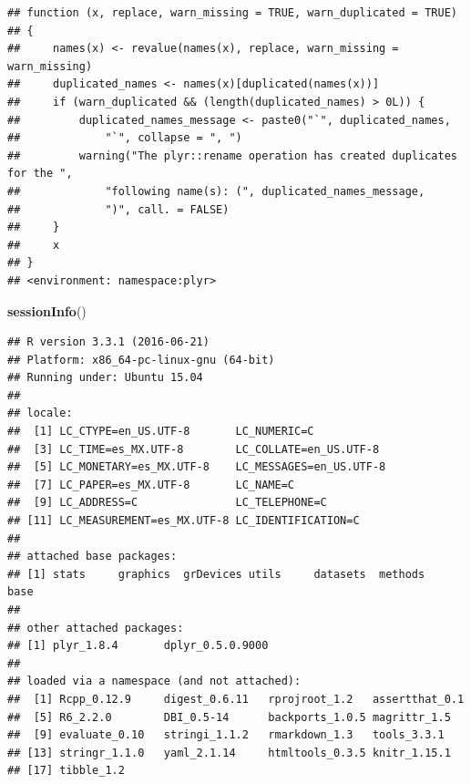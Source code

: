 \documentclass[]{article}
\newenvironment{Shaded}{\begin{snugshade}}{\end{snugshade}}
\newcommand{\KeywordTok}[1]{\textcolor[rgb]{0.13,0.29,0.53}{\textbf{{#1}}}}
\newcommand{\NormalTok}[1]{{#1}}
\begin{document}
\begin{verbatim}
## function (x, replace, warn_missing = TRUE, warn_duplicated = TRUE) 
## {
##     names(x) <- revalue(names(x), replace, warn_missing = warn_missing)
##     duplicated_names <- names(x)[duplicated(names(x))]
##     if (warn_duplicated && (length(duplicated_names) > 0L)) {
##         duplicated_names_message <- paste0("`", duplicated_names, 
##             "`", collapse = ", ")
##         warning("The plyr::rename operation has created duplicates for the ", 
##             "following name(s): (", duplicated_names_message, 
##             ")", call. = FALSE)
##     }
##     x
## }
## <environment: namespace:plyr>
\end{verbatim}

\printbibliography

\begin{Shaded}
\begin{Highlighting}[]
\KeywordTok{sessionInfo}\NormalTok{()}
\end{Highlighting}
\end{Shaded}

\begin{verbatim}
## R version 3.3.1 (2016-06-21)
## Platform: x86_64-pc-linux-gnu (64-bit)
## Running under: Ubuntu 15.04
## 
## locale:
##  [1] LC_CTYPE=en_US.UTF-8       LC_NUMERIC=C              
##  [3] LC_TIME=es_MX.UTF-8        LC_COLLATE=en_US.UTF-8    
##  [5] LC_MONETARY=es_MX.UTF-8    LC_MESSAGES=en_US.UTF-8   
##  [7] LC_PAPER=es_MX.UTF-8       LC_NAME=C                 
##  [9] LC_ADDRESS=C               LC_TELEPHONE=C            
## [11] LC_MEASUREMENT=es_MX.UTF-8 LC_IDENTIFICATION=C       
## 
## attached base packages:
## [1] stats     graphics  grDevices utils     datasets  methods   base     
## 
## other attached packages:
## [1] plyr_1.8.4       dplyr_0.5.0.9000
## 
## loaded via a namespace (and not attached):
##  [1] Rcpp_0.12.9     digest_0.6.11   rprojroot_1.2   assertthat_0.1 
##  [5] R6_2.2.0        DBI_0.5-14      backports_1.0.5 magrittr_1.5   
##  [9] evaluate_0.10   stringi_1.1.2   rmarkdown_1.3   tools_3.3.1    
## [13] stringr_1.1.0   yaml_2.1.14     htmltools_0.3.5 knitr_1.15.1   
## [17] tibble_1.2
\end{verbatim}
\end{document}
